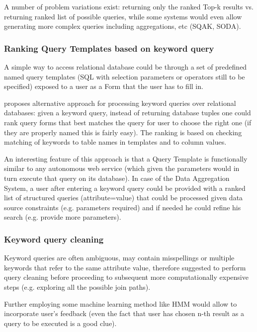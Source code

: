 % 
A number of problem variations exist:  returning only the ranked Top-k results vs. returning ranked list of possible queries, while some systems would even allow generating more complex queries including aggregations, etc (SQAK, SODA\cite{ethz2012}).

\subsubsection*{Ranking Query Templates based on keyword query}
A simple way to access relational database could  be through a set of predefined named query templates (SQL with selection parameters or operators still to be specified) exposed to a user as a Form that the user has to fill in.

\cite{forms_kws} proposes alternative approach for processing keyword queries over relational databases: given a keyword query, instead of returning database tuples one could rank query forms that best matches the query for user to choose the right one (if they are properly named this is fairly easy). The ranking is based on checking matching of keywords to table names in templates and to column values.

An interesting feature of this approach is that a Query Template is functionally similar to any autonomous web service (which given the parameters would in turn execute that query on its database).  In case of the Data Aggregation System, a user after entering a keyword query could be provided with a ranked list of structured queries (attribute=value) that could be processed given data source constraints (e.g. parameters required) and if needed he could refine his search (e.g. provide more parameters).


\subsubsection*{Keyword query cleaning}
Keyword queries are often ambiguous, may contain misspellings or multiple keywords that refer to the same attribute value,  therefore \cite{kw_cleaning} suggested to perform query cleaning before proceeding to subsequent more computationally expensive steps (e.g. exploring all the possible join paths).

Further employing some machine learning method like HMM\cite{kw_cleaning_hmm} would allow to incorporate user's feedback (even the fact that user has chosen n-th result as a query to be executed is a good clue).


